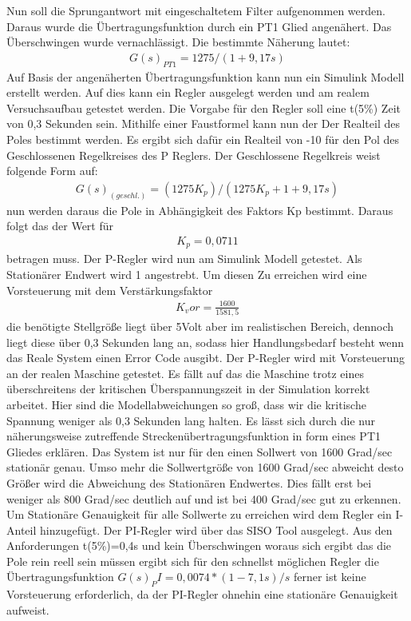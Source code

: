 \documentclass[10pt]{scrartcl}
\begin{document}
	Nun soll die Sprungantwort mit eingeschaltetem Filter aufgenommen werden. Daraus wurde die Übertragungsfunktion durch ein PT1 Glied angenähert. Das Überschwingen wurde vernachlässigt. Die bestimmte Näherung lautet: 
\begin{align}
G(s)_{PT1}=1275/(1+9,17s)
 \end{align}
	Auf Basis der angenäherten Übertragungsfunktion kann nun ein Simulink Modell erstellt werden. Auf dies kann ein Regler ausgelegt werden und am realem Versuchsaufbau getestet werden.
	Die Vorgabe für den Regler soll eine t(5\%) Zeit von 0,3 Sekunden sein. Mithilfe einer Faustformel kann nun der Der Realteil des Poles bestimmt werden. Es ergibt sich dafür ein Realteil von -10 für den Pol des Geschlossenen Regelkreises des P Reglers. Der Geschlossene Regelkreis weist folgende Form auf: 
\begin{align}
G(s)_(geschl.)=(1275K_p)/(1275K_p+ 1+9,17s)
 \end{align}
 nun werden daraus die Pole in Abhängigkeit des Faktors Kp bestimmt. Daraus folgt das der Wert für 
\begin{align}
K_p=0,0711
 \end{align} 
betragen muss. 
	Der P-Regler wird nun am Simulink Modell getestet. Als Stationärer Endwert wird 1 angestrebt. Um diesen Zu erreichen wird eine Vorsteuerung mit dem Verstärkungsfaktor 
\begin{align}
K_vor=\frac{1600}{1581,5}
 \end{align} 
 die benötigte Stellgröße liegt über 5Volt aber im realistischen Bereich, dennoch liegt diese über 0,3 Sekunden lang an, sodass hier Handlungsbedarf besteht wenn das Reale System einen Error Code ausgibt.
	Der P-Regler wird mit Vorsteuerung an der realen Maschine getestet. Es fällt auf das die Maschine trotz eines überschreitens der kritischen Überspannungszeit in der Simulation korrekt arbeitet. Hier sind die Modellabweichungen so groß, dass wir die kritische Spannung weniger als 0,3 Sekunden  lang halten. Es lässt sich durch die nur näherungsweise zutreffende Streckenübertragungsfunktion in form eines PT1 Gliedes erklären. Das System ist nur für den einen Sollwert von 1600 Grad/sec stationär genau. Umso mehr die Sollwertgröße von 1600 Grad/sec abweicht desto Größer wird die Abweichung des Stationären Endwertes. Dies fällt erst bei weniger als 800 Grad/sec deutlich auf und ist bei 400 Grad/sec gut zu erkennen.
	Um Stationäre Genauigkeit für alle Sollwerte zu erreichen wird dem Regler ein I-Anteil hinzugefügt. Der PI-Regler wird über das SISO Tool ausgelegt. Aus den Anforderungen t(5\%)=0,4s und kein Überschwingen woraus sich ergibt das die Pole rein reell sein müssen ergibt sich für den schnellst möglichen Regler die Übertragungsfunktion 
$G(s)_PI=0,0074*(1-7,1s)/s$ ferner ist keine Vorsteuerung erforderlich, da der PI-Regler ohnehin eine stationäre Genauigkeit aufweist. 
\end{document}
